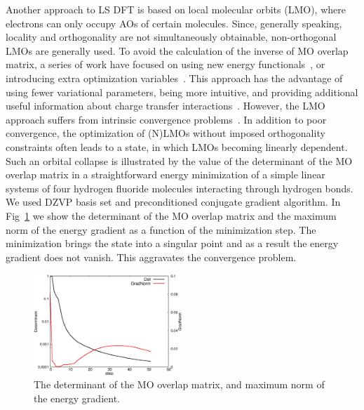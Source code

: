 \documentclass[aps,prl,twocolumn,reprint,amsmath,amssymb]{revtex4-1}
\begin{document}
Another approach to LS DFT is based on local molecular orbits (LMO), where electrons can only occupy AOs of certain molecules. Since, generally speaking, locality and orthogonality are not simultaneously obtainable, non-orthogonal LMOs are generally used. 
To avoid the calculation of the inverse of MO overlap matrix, a series of work have focused on using new energy functionals~\cite{mauri1993orbital,kim1995total,ordejon1995linear}, or introducing extra optimization variables~\cite{burger2008linear,peng2013effective}. This approach has the advantage of using fewer variational parameters, being more intuitive, and providing additional useful information about charge transfer interactions~\cite{khaliullin2007unravelling,khaliullin2008analysis}. However, the LMO approach suffers from intrinsic convergence problems~\cite{ordejon1995linear,fattebert2004linear}.
%
%
In addition to poor convergence, the optimization of (N)LMOs without imposed orthogonality constraints often leads to a state, in which LMOs becoming linearly dependent. Such an orbital collapse is illustrated by the value of the determinant of the MO overlap matrix in a straightforward energy minimization of a simple linear systems of four hydrogen fluoride molecules interacting through hydrogen bonds. We used DZVP basis set and preconditioned conjugate gradient algorithm. In Fig~\ref{fig:det} we show the determinant of the MO overlap matrix and the maximum norm of the energy gradient as a function of the minimization step. The minimization brings the state into a singular point and as a result the energy gradient does not vanish. This aggravates the convergence problem.


\begin{figure}
\includegraphics[width=0.5\textwidth]{det}
\caption{The determinant of the MO overlap matrix, and maximum norm of the energy gradient. }
\label{fig:det}
\end{figure}
\end{document}
